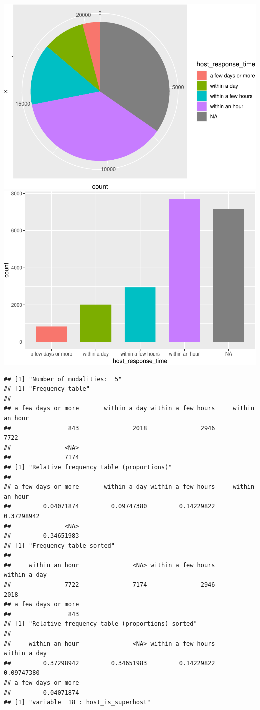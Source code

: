 \includegraphics{anal_files/figure-latex/unnamed-chunk-9-2.pdf}
\includegraphics{anal_files/figure-latex/unnamed-chunk-9-3.pdf}

\begin{verbatim}
## [1] "Number of modalities:  5"
## [1] "Frequency table"
## 
## a few days or more       within a day within a few hours     within an hour 
##                843               2018               2946               7722 
##               <NA> 
##               7174 
## [1] "Relative frequency table (proportions)"
## 
## a few days or more       within a day within a few hours     within an hour 
##         0.04071874         0.09747380         0.14229822         0.37298942 
##               <NA> 
##         0.34651983 
## [1] "Frequency table sorted"
## 
##     within an hour               <NA> within a few hours       within a day 
##               7722               7174               2946               2018 
## a few days or more 
##                843 
## [1] "Relative frequency table (proportions) sorted"
## 
##     within an hour               <NA> within a few hours       within a day 
##         0.37298942         0.34651983         0.14229822         0.09747380 
## a few days or more 
##         0.04071874 
## [1] "variable  18 : host_is_superhost"
\end{verbatim}

